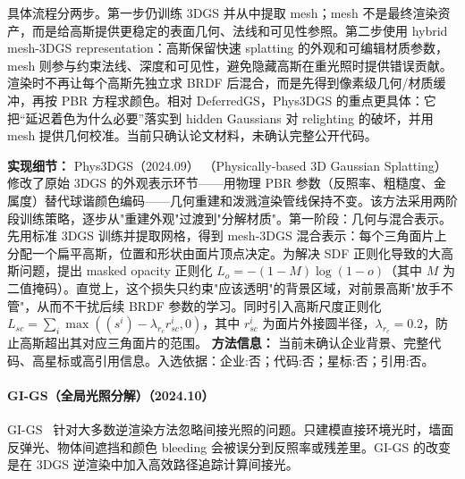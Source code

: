 具体流程分两步。第一步仍训练 3DGS 并从中提取 mesh；mesh 不是最终渲染资产，而是给高斯提供更稳定的表面几何、法线和可见性参照。第二步使用 hybrid mesh-3DGS representation：高斯保留快速 splatting 的外观和可编辑材质参数，mesh 则参与约束法线、深度和可见性，避免隐藏高斯在重光照时提供错误贡献。渲染时不再让每个高斯先独立求 BRDF 后混合，而是先得到像素级几何/材质缓冲，再按 PBR 方程求颜色。相对 DeferredGS，Phys3DGS 的重点更具体：它把“延迟着色为什么必要”落实到 hidden Gaussians 对 relighting 的破坏，并用 mesh 提供几何校准。当前只确认论文材料，未确认完整公开代码。

\textbf{实现细节：} Phys3DGS（2024.09） （Physically-based 3D Gaussian Splatting）修改了原始 3DGS 的外观表示环节——用物理 PBR 参数（反照率、粗糙度、金属度）替代球谐颜色编码——几何重建和泼溅渲染管线保持不变。该方法采用两阶段训练策略，逐步从"重建外观"过渡到"分解材质"。第一阶段：几何与混合表示。先用标准 3DGS 训练并提取网格，得到 mesh-3DGS 混合表示：每个三角面片上分配一个扁平高斯，位置和形状由面片顶点决定。为解决 SDF 正则化导致的大高斯问题，提出 masked opacity 正则化 $L_o = -(1 - M) \log(1 - o)$（其中 $M$ 为二值掩码）。直觉上，这个损失只约束"应该透明"的背景区域，对前景高斯"放手不管"，从而不干扰后续 BRDF 参数的学习。同时引入高斯尺度正则化 $L_{sc} = \sum_i \max((s^i) - \lambda_{r_c} r^i_{sc}, 0)$，其中 $r^i_{sc}$ 为面片外接圆半径，$\lambda_{r_c} = 0.2$，防止高斯超出其对应三角面片的范围。
\textbf{方法信息：} 当前未确认企业背景、完整代码、高星标或高引用信息。入选依据：企业:否；代码:否；星标:否；引用:否。


\paragraph{GI-GS（全局光照分解）（2024.10）}
GI-GS~\cite{2410_02619} 针对大多数逆渲染方法忽略间接光照的问题。只建模直接环境光时，墙面反弹光、物体间遮挡和颜色 bleeding 会被误分到反照率或残差里。GI-GS 的改变是在 3DGS 逆渲染中加入高效路径追踪计算间接光。


